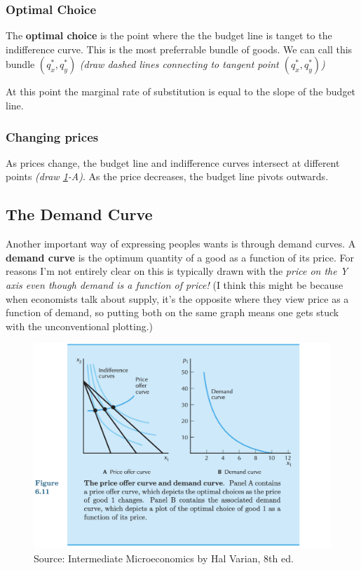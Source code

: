 \documentclass[11pt]{article}
\begin{document}
\subsubsection{Optimal Choice}

The {\bf optimal choice} is the point where the the budget line is tanget to the indifference curve. This is the most preferrable bundle of goods. We can call this bundle $(q_x^*, q_y^*)$ {\it (draw dashed lines connecting to tangent point $(q_x^*, q_y^*)$)}

At this point the marginal rate of substitution is equal to the slope of the budget line.

\subsubsection{Changing prices}

As prices change, the budget line and indifference curves intersect at different points {\it (draw \ref{fig:demand}-A)}.
As the price decreases, the budget line pivots outwards.


\subsection{The Demand Curve}

Another important way of expressing peoples wants is through demand curves. 
A {\bf demand curve} is the optimum quantity of a good as a function of its price. 
For reasons I'm not entirely clear on this is typically drawn with the {\it price on the Y axis even though demand is a function of price!}
(I think this might be because when economists talk about supply, it's the opposite where they view price as a function of demand, so putting both on the same graph means one gets stuck with the unconventional plotting.)



\begin{figure}[h]
    \centering
    \includegraphics*[width=4.5in]{demandcurve.png}
    \caption{Source: Intermediate Microeconomics by Hal Varian, 8th ed.}
    \label{fig:demand}
\end{figure}
\end{document}
